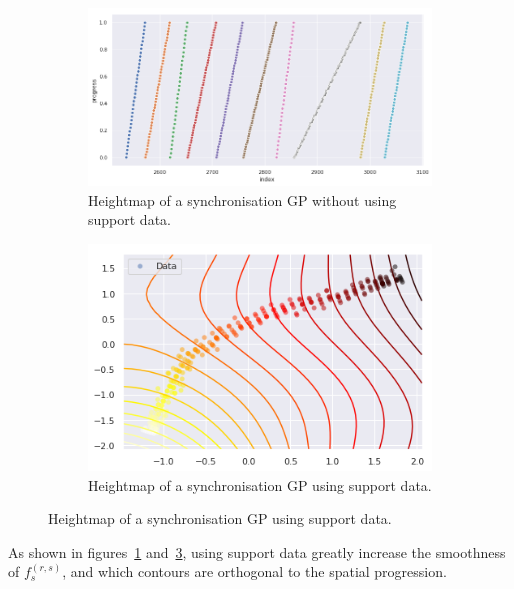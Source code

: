 \begin{figure}[H]
  \begin{subfigure}[b]{0.5\textwidth}
    \includegraphics[width=\textwidth]{figures/normalised-stop-compressed.png}
    \caption{Heightmap of a synchronisation GP without using support data.}
    \label{fig:heightmap-without-support}
  \end{subfigure}
  \begin{subfigure}[b]{0.5\textwidth}
    \includegraphics[width=\textwidth]{figures/synch-gp-hm.png}
    \caption{Heightmap of a synchronisation GP using support data.}
    \label{fig:heightmap-with-support}
  \end{subfigure}
\end{figure}

As shown in figures~\ref{fig:heightmap-without-support} and~\ref{fig:heightmap-with-support}, using support data greatly increase the smoothness of $f^{(r,s)}_s$, and which contours are orthogonal to the spatial progression.


